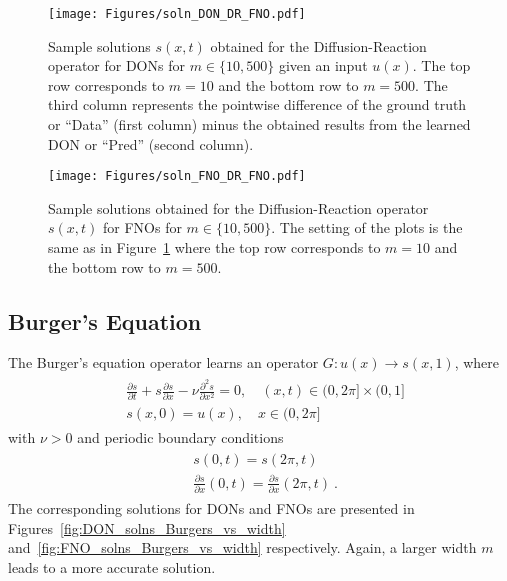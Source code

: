 \begin{figure}[t!]
    \centering
    \texttt{[image: Figures/soln\_DON\_DR\_FNO.pdf]}
    \caption{Sample solutions $s(x,t)$ obtained for the Diffusion-Reaction operator for DONs for $m\in \{10,500\}$ given an input $u(x)$. The top row corresponds to $m=10$ and the bottom row to $m=500$. The third column represents the pointwise difference of the ground truth or ``Data'' (first column) minus the obtained results from the learned DON or ``Pred'' (second column).}
    \label{fig:DON_DR_solns_vs_width}
\end{figure}
\begin{figure}[t!]
    \centering
    \texttt{[image: Figures/soln\_FNO\_DR\_FNO.pdf]}
    \caption{Sample solutions obtained for the Diffusion-Reaction operator $s(x, t)$ for FNOs for $m\in \{10,500\}$. The setting of the plots is the same as in Figure~\ref{fig:DON_DR_solns_vs_width} where the top row corresponds to $m=10$ and the bottom row to $m=500$.}
    \label{fig:FNO_DR_solns_vs_width}
\end{figure}

\subsection{Burger's Equation}
The Burger's equation operator learns an operator $G: u(x) \to s(x, 1)$, where 
\begin{align}
    \begin{aligned}
        & \frac{\partial s}{\partial t}
        +
        s \frac{\partial s}{\partial x}
        -
        \nu \frac{\partial^2 s}{\partial x^2}
        =
        0, \quad(x, t) \in(0, 2\pi] \times(0,1] \\
        & s(x, 0)=u(x), \quad x \in(0,2\pi]
    \end{aligned}\label{eq:Burgers}
\end{align}
with $\nu>0$ and periodic boundary conditions
\begin{align*}
    \begin{aligned}
        & s(0, t)=s(2\pi, t) \\
        & \frac{\partial s}{\partial x}(0, t)=\frac{\partial s}{\partial x}(2\pi, t)~.
    \end{aligned}
\end{align*}
%
The corresponding solutions for DONs and FNOs are presented in Figures~\ref{fig:DON_solns_Burgers_vs_width} and~\ref{fig:FNO_solns_Burgers_vs_width} respectively. Again, a larger width $m$ leads to a more accurate solution.

